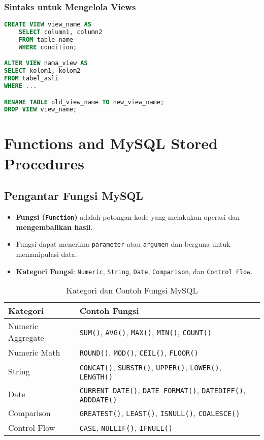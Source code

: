 \documentclass{article}
\begin{document}
\subsubsection{Sintaks untuk Mengelola Views}
\begin{lstlisting}[language=SQL, caption={Membuat dan Mengubah Views}, captionpos=b]
CREATE VIEW view_name AS
    SELECT column1, column2
    FROM table_name
    WHERE condition;

ALTER VIEW nama_view AS
SELECT kolom1, kolom2
FROM tabel_asli
WHERE ...

RENAME TABLE old_view_name TO new_view_name;
DROP VIEW view_name;
\end{lstlisting}

\newpage
\section{Functions and MySQL Stored Procedures}
\subsection{Pengantar Fungsi MySQL}
\begin{itemize}
    \item \textbf{Fungsi (\texttt{Function})} adalah potongan kode yang melakukan operasi dan \textbf{mengembalikan hasil}.
    \item Fungsi dapat menerima \texttt{parameter} atau \texttt{argumen} dan berguna untuk memanipulasi data.
    \item \textbf{Kategori Fungsi}: \texttt{Numeric}, \texttt{String}, \texttt{Date}, \texttt{Comparison}, dan \texttt{Control Flow}.
\end{itemize}

\begin{table}[!ht]
    \caption{Kategori dan Contoh Fungsi MySQL}
    \centering
    \begin{tabular}{|l|l|}
        \hline
        \textbf{Kategori} & \textbf{Contoh Fungsi}                                                                      \\
        \hline
        Numeric Aggregate & \texttt{SUM()}, \texttt{AVG()}, \texttt{MAX()}, \texttt{MIN()}, \texttt{COUNT()}            \\
        \hline
        Numeric Math      & \texttt{ROUND()}, \texttt{MOD()}, \texttt{CEIL()}, \texttt{FLOOR()}                         \\
        \hline
        String            & \texttt{CONCAT()}, \texttt{SUBSTR()}, \texttt{UPPER()}, \texttt{LOWER()}, \texttt{LENGTH()} \\
        \hline
        Date              & \texttt{CURRENT\_DATE()}, \texttt{DATE\_FORMAT()}, \texttt{DATEDIFF()}, \texttt{ADDDATE()}  \\
        \hline
        Comparison        & \texttt{GREATEST()}, \texttt{LEAST()}, \texttt{ISNULL()}, \texttt{COALESCE()}               \\
        \hline
        Control Flow      & \texttt{CASE}, \texttt{NULLIF()}, \texttt{IFNULL()}                                         \\
        \hline
    \end{tabular}
\end{table}
\end{document}

